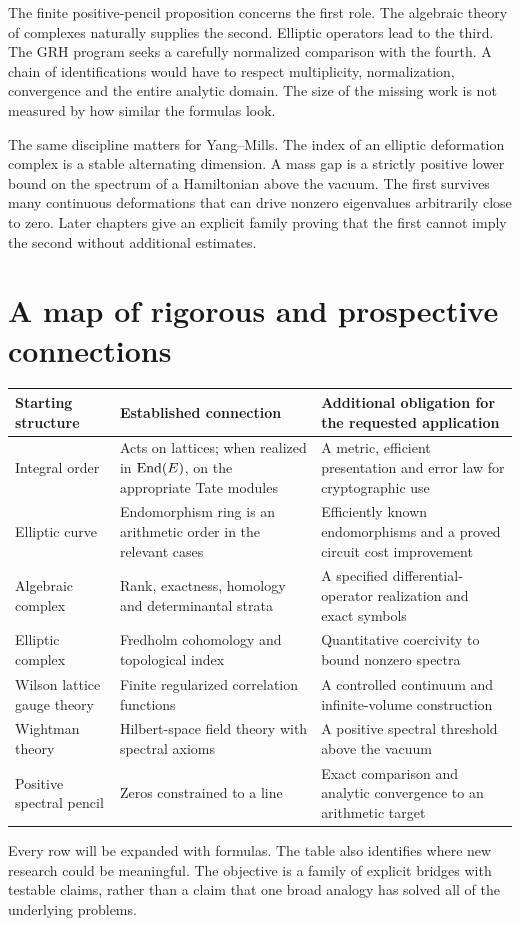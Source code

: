 The finite positive-pencil proposition concerns the first role. The algebraic theory of complexes naturally supplies the second. Elliptic operators lead to the third. The GRH program seeks a carefully normalized comparison with the fourth. A chain of identifications would have to respect multiplicity, normalization, convergence and the entire analytic domain. The size of the missing work is not measured by how similar the formulas look.

The same discipline matters for Yang--Mills. The index of an elliptic deformation complex is a stable alternating dimension. A mass gap is a strictly positive lower bound on the spectrum of a Hamiltonian above the vacuum. The first survives many continuous deformations that can drive nonzero eigenvalues arbitrarily close to zero. Later chapters give an explicit family proving that the first cannot imply the second without additional estimates.

\section{A map of rigorous and prospective connections}
\begin{longtable}{p{}p{}p{}}
\toprule
Starting structure & Established connection & Additional obligation for the requested application\\\midrule
Integral order & Acts on lattices; when realized in $\operatorname{End}(E)$, on the appropriate Tate modules & A metric, efficient presentation and error law for cryptographic use\\
Elliptic curve & Endomorphism ring is an arithmetic order in the relevant cases & Efficiently known endomorphisms and a proved circuit cost improvement\\
Algebraic complex & Rank, exactness, homology and determinantal strata & A specified differential-operator realization and exact symbols\\
Elliptic complex & Fredholm cohomology and topological index & Quantitative coercivity to bound nonzero spectra\\
Wilson lattice gauge theory & Finite regularized correlation functions & A controlled continuum and infinite-volume construction\\
Wightman theory & Hilbert-space field theory with spectral axioms & A positive spectral threshold above the vacuum\\
Positive spectral pencil & Zeros constrained to a line & Exact comparison and analytic convergence to an arithmetic target\\\bottomrule
\end{longtable}
Every row will be expanded with formulas. The table also identifies where new research could be meaningful. The objective is a family of explicit bridges with testable claims, rather than a claim that one broad analogy has solved all of the underlying problems.
